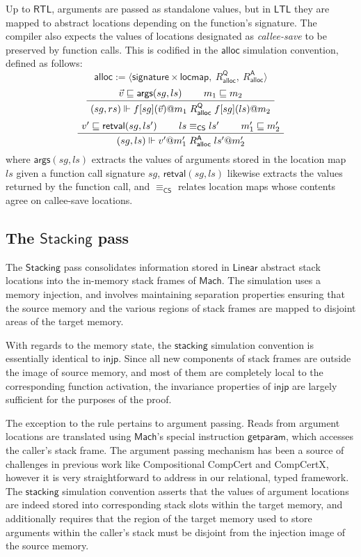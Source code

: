 \documentclass[sigplan,10pt,review,anonymous]{acmart}
\newcommand{\kw}[1]{\ensuremath{ \mathsf{#1} }}
\begin{document}
Up to \kw{RTL},
arguments are passed as standalone values,
but in \kw{LTL}
they are mapped to abstract locations
depending on the function's signature.
The compiler also expects the values of
locations designated as \emph{callee-save}
to be preserved by function calls.
This is codified in the $\kw{alloc}$
simulation convention, defined as follows:
\[
  \kw{alloc} := \langle
      \kw{signature} \times \kw{locmap}, \:
      R_\kw{alloc}^\kw{Q}, \:
      R_\kw{alloc}^\kw{A} \rangle
\]
\[
  \AxiomC{$\vec{v} \sqsubseteq \kw{args}(sg, ls)$}
  \AxiomC{$m_1 \sqsubseteq m_2$}
  \BinaryInfC{$
      (sg, rs) \Vdash
      f[sg](\vec{v})@m_1
      \mathrel{R_\kw{alloc}^\kw{Q}}
      f[sg](ls)@m_2$}
  \DisplayProof
\]
\[
  \AxiomC{$v' \sqsubseteq \kw{retval}(sg, ls')$}
  \AxiomC{$ls \equiv_\kw{CS} ls'$}
  \AxiomC{$m_1' \sqsubseteq m_2'$}
  \TrinaryInfC{$
      (sg, ls) \Vdash
      v'@m_1'
      \mathrel{R_\kw{alloc}^\kw{A}}
      ls'@m_2'$}
  \DisplayProof
\]
where $\kw{args}(sg, ls)$ extracts the values of arguments
stored in the location map $ls$ given a function call signature $sg$,
$\kw{retval}(sg, ls)$ likewise extracts the
values returned by the function call, and
$\equiv_\kw{CS}$ relates location maps whose contents agree
on callee-save locations.


\subsection{The \kw{Stacking} pass} %

The \kw{Stacking} pass
consolidates information stored in
\kw{Linear} abstract stack locations
into the in-memory stack frames of \kw{Mach}.
The simulation uses a memory injection,
and involves maintaining separation properties
ensuring that the source memory and
the various regions of stack frames
are mapped to disjoint areas of the target memory.

With regards to the memory state,
the \kw{stacking} simulation convention
is essentially identical to \kw{injp}.
Since all new components of stack frames
are outside the image of source memory,
and most of them are completely local to
the corresponding function activation,
the invariance properties of \kw{injp}
are largely sufficient for the purposes of the proof.

The exception to the rule pertains to argument passing.
Reads from argument locations are translated
using \kw{Mach}'s special instruction \kw{getparam},
which accesses the caller's stack frame.
The argument passing mechanism has been a source of challenges
in previous work like Compositional CompCert and CompCertX,
however it is very straightforward to address
in our relational, typed framework.
The \kw{stacking} simulation convention
asserts that the values of argument locations
are indeed stored into corresponding stack slots
within the target memory,
and additionally
requires that the region of the target memory
used to store arguments within the caller's stack
must be disjoint from the injection image of the source memory.
\end{document}
